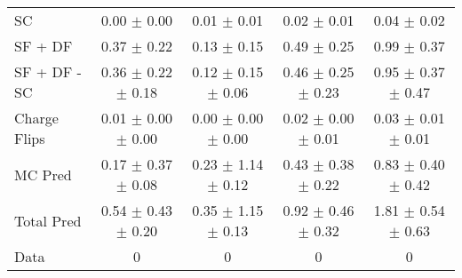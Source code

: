 \begin{tabular}{l|cccc}
                                 SC &  0.00 $\pm$  0.00 &  0.01 $\pm$  0.01 &  0.02 $\pm$  0.01 &  0.04 $\pm$  0.02 \\
                            SF + DF &  0.37 $\pm$  0.22 &  0.13 $\pm$  0.15 &  0.49 $\pm$  0.25 &  0.99 $\pm$  0.37 \\
\hline
                       SF + DF - SC &  0.36 $\pm$  0.22 $\pm$  0.18 &  0.12 $\pm$  0.15 $\pm$  0.06 &  0.46 $\pm$  0.25 $\pm$  0.23 &  0.95 $\pm$  0.37 $\pm$  0.47 \\
\hline\hline
                       Charge Flips &  0.01 $\pm$  0.00 $\pm$  0.00 &  0.00 $\pm$  0.00 $\pm$  0.00 &  0.02 $\pm$  0.00 $\pm$  0.01 &  0.03 $\pm$  0.01 $\pm$  0.01 \\
\hline
                            MC Pred &  0.17 $\pm$  0.37 $\pm$  0.08 &  0.23 $\pm$  1.14 $\pm$  0.12 &  0.43 $\pm$  0.38 $\pm$  0.22 &  0.83 $\pm$  0.40 $\pm$  0.42 \\
\hline
                         Total Pred &  0.54 $\pm$  0.43 $\pm$  0.20 &  0.35 $\pm$  1.15 $\pm$  0.13 &  0.92 $\pm$  0.46 $\pm$  0.32 &  1.81 $\pm$  0.54 $\pm$  0.63 \\
\hline\hline
                               Data &     0 &     0 &     0 &     0 \\
\hline\hline
\end{tabular}

